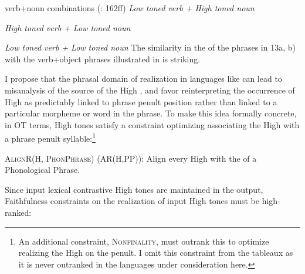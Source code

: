 \documentclass[output=paper,newtxmath,modfonts,nonflat,hidelinks]{langsci/langscibook}
\begin{document}
\largerpage 
\ea\label{ex:downing:13}  verb+noun combinations (\citealt{Kisseberth1984}: 162ff)
\ea\label{ex:downing:13a} \textit{Low toned verb + High toned noun}
\sn
{}
\sn
{}
\sn
{}

\ex\label{ex:downing:13b}  \textit{High toned verb + Low toned noun}
\sn
{}
\sn
{}
\sn
{}
\sn
{}

\ex\label{ex:downing:13c}\textit{Low toned verb + Low toned noun}
\sn
{}
\sn
{}
\z
\z
The similarity in the  of the  phrases in 13a, b) with the  verb+ob\-ject phrases illustrated in  is striking.

I propose that the phrasal domain of  realization in languages like  can lead to misanalysis of the source of the High , and favor reinterpreting the occurrence of High  as predictably linked to phrase penult position rather than linked to a particular morpheme or word in the phrase. To make this idea formally concrete, in OT terms,  High tones satisfy a constraint optimizing associating the High  with a phrase penult syllable:\footnote{An additional constraint, \textsc{Nonfinality,} must outrank this  to optimize realizing the High  on the penult. I omit this constraint from the tableaux as it is never outranked in the languages under consideration here.}


\ea\label{ex:downing:14}\textsc{AlignR(H, PhonPhrase}) (AR(H,PP)):
\sn
Align every High  with the  of a Phonological Phrase.
\z 

Since input lexical contrastive High tones are maintained in the output, Faithfulness constraints on the realization of input High tones must be high-ranked:
\end{document}
